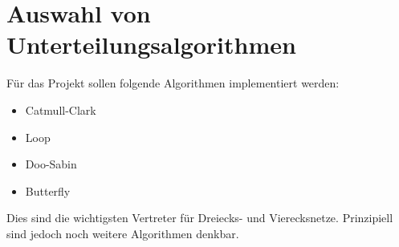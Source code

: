 \section{Auswahl von Unterteilungsalgorithmen}

Für das Projekt sollen folgende Algorithmen implementiert werden:
\begin{itemize}
	\item Catmull-Clark
	\item Loop
	\item Doo-Sabin
	\item Butterfly
\end{itemize}
Dies sind die wichtigsten Vertreter für Dreiecks- und Vierecksnetze.
Prinzipiell sind jedoch noch weitere Algorithmen denkbar.
\cite[S. 65ff]{Zorin.subdivcourse} \cite{Standford.24.07.2015}





